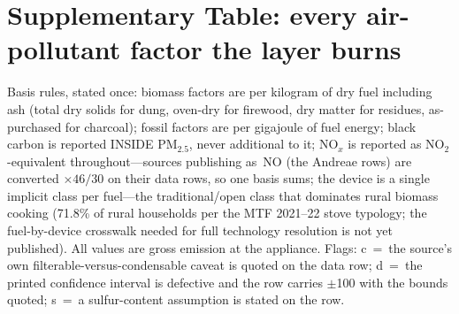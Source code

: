 \section{Supplementary Table: every air-pollutant factor the layer burns}
\label{app:factors}

Basis rules, stated once: biomass factors are per kilogram of dry fuel
including ash (total dry solids for dung, oven-dry for firewood, dry matter
for residues, as-purchased for charcoal); fossil factors are per gigajoule of
fuel energy; black carbon is reported INSIDE PM$_{2.5}$, never additional to
it; NO$_x$ is reported as NO$_2$-equivalent throughout---sources publishing
as~NO (the Andreae rows) are converted $\times 46/30$ on their data rows, so
one basis sums; the device is a single implicit class per fuel---the
traditional/open class that dominates rural biomass cooking (71.8\% of rural
households per the MTF 2021--22 stove typology; the fuel-by-device crosswalk
needed for full technology resolution is not yet published). All
values are gross emission at the appliance. Flags: c~=~the source's own
filterable-versus-condensable caveat is quoted on the data row; d~=~the
printed confidence interval is defective and the row carries $\pm$100 with
the bounds quoted; s~=~a sulfur-content assumption is stated on the row.

